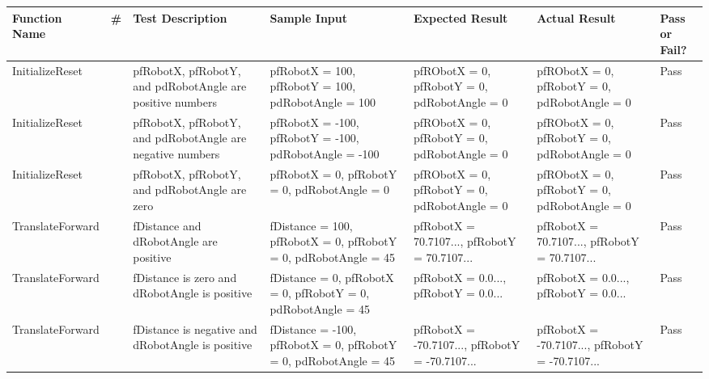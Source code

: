 \documentclass[10pt, letterpaper]{article}
\begin{document}
\begin{table}[h]
    \centering
    \renewcommand{\arraystretch}{1.5}
    \begin{tabularx}{\textwidth}{
            |>{\raggedright\arraybackslash}p{3cm}
            |>{\raggedright\arraybackslash}p{0.20cm}
            |>{\raggedright\arraybackslash}p{2.5cm}
            |>{\raggedright\arraybackslash}X
            |>{\raggedright\arraybackslash}p{3cm}
            |>{\raggedright\arraybackslash}p{3cm}
            |>{\raggedright\arraybackslash}p{1cm}|
        }
        \hline

        \textbf{Function Name} &
        \textbf{\#} &
        \textbf{Test Description} &
        \textbf{Sample Input} &
        \textbf{Expected Result} &
        \textbf{Actual Result} &
        \textbf{Pass or Fail?} \\ 
        \hline

        InitializeReset &
        1 &
        pfRobotX, pfRobotY, and pdRobotAngle are positive numbers &
        pfRobotX = 100, pfRobotY = 100, pdRobotAngle = 100 &
        pfRObotX = 0, pfRobotY = 0, pdRobotAngle = 0 &
        pfRObotX = 0, pfRobotY = 0, pdRobotAngle = 0 &
        Pass \\
        \hline

        InitializeReset &
        2 &
        pfRobotX, pfRobotY, and pdRobotAngle are negative numbers &
        pfRobotX = -100, pfRobotY = -100, pdRobotAngle = -100 &
        pfRObotX = 0, pfRobotY = 0, pdRobotAngle = 0 &
        pfRObotX = 0, pfRobotY = 0, pdRobotAngle = 0 &
        Pass \\
        \hline

        InitializeReset &
        3 &
        pfRobotX, pfRobotY, and pdRobotAngle are zero &
        pfRobotX = 0, pfRobotY = 0, pdRobotAngle = 0 &
        pfRObotX = 0, pfRobotY = 0, pdRobotAngle = 0 &
        pfRObotX = 0, pfRobotY = 0, pdRobotAngle = 0 &
        Pass \\
        \hline

        TranslateForward &
        1 &
        fDistance and dRobotAngle are positive &
        fDistance = 100, pfRobotX = 0, pfRobotY = 0, pdRobotAngle = 45 &
        pfRobotX = 70.7107..., pfRobotY = 70.7107... &
        pfRobotX = 70.7107..., pfRobotY = 70.7107... &
        Pass \\
        \hline

        TranslateForward &
        2 &
        fDistance is zero and dRobotAngle is positive &
        fDistance = 0, pfRobotX = 0, pfRobotY = 0, pdRobotAngle = 45 &
        pfRobotX = 0.0..., pfRobotY = 0.0... &
        pfRobotX = 0.0..., pfRobotY = 0.0... &
        Pass \\
        \hline

        TranslateForward &
        3 &
        fDistance is negative and dRobotAngle is positive &
        fDistance = -100, pfRobotX = 0, pfRobotY = 0, pdRobotAngle = 45 &
        pfRobotX = -70.7107..., pfRobotY = -70.7107... &
        pfRobotX = -70.7107..., pfRobotY = -70.7107... &
        Pass \\
        \hline


    \end{tabularx}
\end{table}
\newpage
\end{document}
